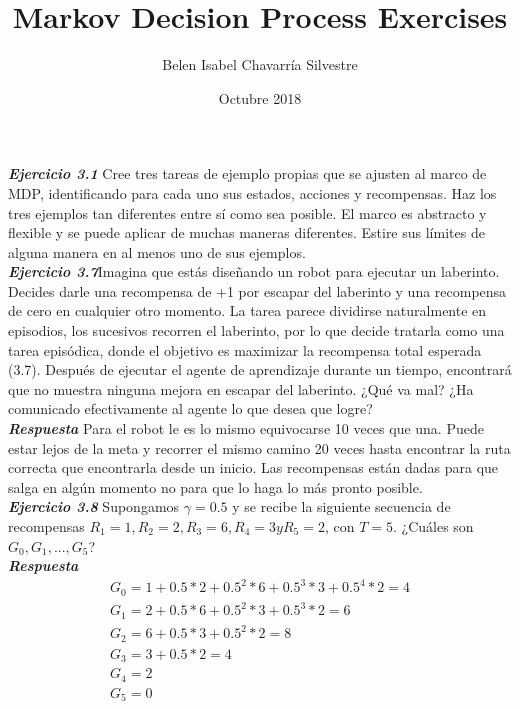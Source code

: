 \documentclass[12pt,letterpaper,twoside]{article}
\title{Markov Decision Process Exercises}
\author{Belen Isabel Chavarría Silvestre}
\date{Octubre 2018}
\begin{document}
\begin{titlepage}
\maketitle
\end{titlepage}


\textbf{\textit{Ejercicio 3.1}} Cree tres tareas de ejemplo propias que se ajusten al marco de MDP, identificando para cada uno sus estados, acciones y recompensas. Haz los tres ejemplos tan diferentes entre sí como sea posible. El marco es abstracto y flexible y se puede aplicar de muchas maneras diferentes. Estire sus límites de alguna manera en al menos uno de sus ejemplos. \\



\textbf{\textit{Ejercicio 3.7}}Imagina que estás diseñando un robot para ejecutar un laberinto. Decides darle una recompensa de +1 por escapar del laberinto y una recompensa de cero en cualquier otro momento. La tarea parece dividirse naturalmente en episodios, los sucesivos recorren el laberinto, por lo que decide tratarla como una tarea episódica, donde el objetivo es maximizar la recompensa total esperada (3.7). Después de ejecutar el agente de aprendizaje durante un tiempo, encontrará que no muestra ninguna mejora en escapar del laberinto. ¿Qué va mal? ¿Ha comunicado efectivamente al agente lo que desea que logre?\\

\textbf{\textit{Respuesta}} Para el robot le es lo mismo equivocarse 10 veces que una. Puede estar lejos de la meta y recorrer el mismo camino 20 veces hasta encontrar la ruta correcta que encontrarla desde un inicio. Las recompensas están dadas para que salga en algún momento no para que lo haga lo más pronto posible. \\

\textbf{\textit{Ejercicio 3.8}} Supongamos $\gamma= 0.5$ y se recibe la siguiente secuencia de recompensas $R_1 = 1, R_2 = 2, R_3 = 6, R_4 = 3 y R_5 = 2$, con $T = 5$. ¿Cuáles son $G_0, G_1,. . ., G_5$? \\
\textbf{\textit{Respuesta}} 
\begin{equation}
\begin{array}{l}
    G_0= 1 + 0.5*2+0.5^2*6+0.5^3*3+0.5^4*2 = 4\\ 
    G_1=2+0.5*6+0.5^2*3+0.5^3*2=6\\
	G_2= 6 + 0.5*3+0.5^2*2 =8\\
	G_3=3+0.5*2=4\\
	G_4=2	\\
	G_5=0

\end{array}
\end{equation}\\
\end{document}
